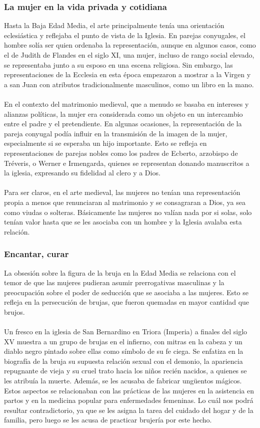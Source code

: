 \documentclass{report}
\begin{document}
\subsubsection{La mujer en la vida privada y cotidiana}
Hasta la Baja Edad Media, el arte principalmente tenía una orientación eclesiástica y reflejaba el punto de vista de la Iglesia. En parejas conyugales, el hombre solía ser quien ordenaba la representación, aunque en algunos casos, como el de Judith de Flandes en el siglo XI, una mujer, incluso de rango social elevado, se representaba junto a su esposo en una escena religiosa. Sin embargo, las representaciones de la Ecclesia en esta época empezaron a mostrar a la Virgen y a san Juan con atributos tradicionalmente masculinos, como un libro en la mano.
\\\\
En el contexto del matrimonio medieval, que a menudo se basaba en intereses y alianzas políticas, la mujer era considerada como un objeto en un intercambio entre el padre y el pretendiente. En algunas ocasiones, la representación de la pareja conyugal podía influir en la transmisión de la imagen de la mujer, especialmente si se esperaba un hijo importante. Esto se refleja en representaciones de parejas nobles como los padres de Ecberto, arzobispo de Tréveris, o Werner e Irmengarda, quienes se representan donando manuscritos a la iglesia, expresando su fidelidad al clero y a Dios. 
\\\\
Para ser claros, en el arte medieval, las mujeres no tenían una representación propia a menos que renunciaran al matrimonio y se consagraran a Dios, ya sea como viudas o solteras. Básicamente las mujeres no valían nada por si solas, solo tenían valor hasta que se les asociaba con un hombre y la Iglesia avalaba esta relación. 
\subsubsection{Encantar, curar}
La obsesión sobre la figura de la bruja en la Edad Media se relaciona con el temor de que las mujeres pudieran asumir prerrogativas masculinas y la preocupación sobre el poder de seducción que se asociaba a las mujeres. Esto se refleja en la persecución de brujas, que fueron quemadas en mayor cantidad que brujos.
\\\\
Un fresco en la iglesia de San Bernardino en Triora (Imperia) a finales del siglo XV muestra a un grupo de brujas en el infierno, con mitras en la cabeza y un diablo negro pintado sobre ellas como símbolo de su fe ciega. Se enfatiza en la biografía de la bruja su supuesta relación sexual con el demonio, la apariencia repugnante de vieja y su cruel trato hacia los niños recién nacidos, a quienes se les atribuía la muerte. Además, se les acusaba de fabricar ungüentos mágicos. Estos aspectos se relacionaban con las prácticas de las mujeres en la asistencia en partos y en la medicina popular para enfermedades femeninas. Lo cuál nos podrá resultar contradictorio, ya que se les asigna la tarea del cuidado del hogar y de la familia, pero luego se les acusa de practicar brujería por este hecho. 
\end{document}
